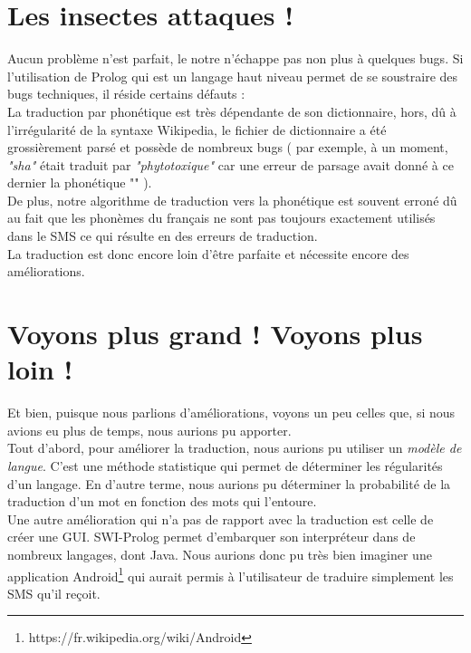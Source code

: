 \documentclass[11pt]{report}
\begin{document}
	\section{Les insectes attaques !}
	Aucun problème n'est parfait, le notre n’échappe pas non plus à quelques bugs. Si l'utilisation de Prolog qui est un langage haut niveau permet de se soustraire des bugs techniques, il réside certains défauts :\\
	La traduction par phonétique est très dépendante de son dictionnaire, hors, dû à l'irrégularité de la syntaxe Wikipedia, le fichier de dictionnaire a été grossièrement parsé et possède de nombreux bugs ( par exemple, à un moment, {\em "sha"} était traduit par {\em "phytotoxique"} car une erreur de parsage avait donné à ce dernier la phonétique "" ).\\
	De plus, notre algorithme de traduction vers la phonétique est souvent erroné dû au fait que les phonèmes du français ne sont pas toujours exactement utilisés dans le SMS ce qui résulte en des erreurs de traduction.\\
	La traduction est donc encore loin d'être parfaite et nécessite encore des améliorations. 
	
	\section{Voyons plus grand ! Voyons plus loin !}
	Et bien, puisque nous parlions d'améliorations, voyons un peu celles que, si nous avions eu plus de temps, nous aurions pu apporter.\\
	Tout d'abord, pour améliorer la traduction, nous aurions pu utiliser un {\em modèle de langue}. C'est une méthode statistique qui permet de déterminer les régularités d'un langage. En d'autre terme, nous aurions pu déterminer la probabilité de la traduction d'un mot en fonction des mots qui l'entoure.\\
	Une autre amélioration qui n'a pas de rapport avec la traduction est celle de créer une GUI. SWI-Prolog permet d'embarquer son interpréteur dans de nombreux langages, dont Java. Nous aurions donc pu très bien imaginer une application Android\footnote{https://fr.wikipedia.org/wiki/Android} qui aurait permis à l'utilisateur de traduire simplement les SMS qu'il reçoit.
	
\end{document}
